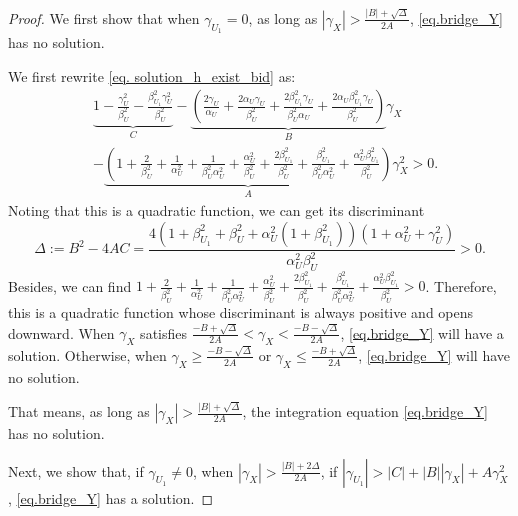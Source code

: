 \documentclass[
  12pt]{article}
\begin{document}
\begin{proof}
We first show that when $\gamma_{U_1} = 0$, as long as $|\gamma_X| > \frac{|B|+\sqrt{\Delta}}{2A}$, \eqref{eq.bridge_Y} has no solution. 

 
We first rewrite \eqref{eq. solution_h_exist_bid} as:
$$
\begin{aligned}
	&\underset{C}{\underbrace{1-\frac{\gamma_{U}^{2}}{\beta_U^2}-\frac{\beta_{U_1}^{2}\gamma_{U}^{2}}{\beta_U^2}}}-\underset{B}{\underbrace{\left( \frac{2\gamma_U}{\alpha_U}+\frac{2\alpha_U\gamma_U}{\beta_{U}^{2}}+\frac{2\beta_{U_1}^{2}\gamma_U}{\beta_{U}^{2}\alpha_U}+\frac{2\alpha_U\beta_{U_1}^{2}\gamma_U}{\beta_{U}^{2}} \right) }}\gamma_X\\
	&-\underset{A}{\underbrace{\left( 1+\frac{2}{\beta_{U}^{2}}+
    \frac{1}{\alpha_{U}^{2}}+\frac{1}{\beta_{U}^{2}\alpha_{U}^{2}}+\frac{\alpha_{U}^{2}}{\beta_{U}^{2}}+\frac{2\beta_{U_1}^{2}}{\beta_{U}^{2}}+\frac{\beta_{U_1}^{2}}{\beta_{U}^{2}\alpha_{U}^{2}}+\frac{\alpha_{U}^{2}\beta_{U_1}^{2}}{\beta_{U}^{2}} \right) }}\gamma_{X}^{2}>0.
\end{aligned}
$$
Noting that this is a quadratic function, we can get its discriminant 
$$
\Delta :=B^2-4AC=\frac{4\left( 1+\beta_{U_1}^{2}+\beta_{U}^{2}+\alpha_{U}^{2}\left( 1+\beta_{U_1}^{2} \right) \right) \left( 1+\alpha_{U}^{2}+\gamma_{U}^{2} \right)}{\alpha_{U}^{2}\beta_{U}^{2}}>0.
$$
Besides, we can find $ 1+\frac{2}{\beta_{U}^{2}}+\frac{1}{\alpha_{U}^{2}}+\frac{1}{\beta_{U}^{2}\alpha_{U}^{2}}+\frac{\alpha_{U}^{2}}{\beta_{U}^{2}}+\frac{2\beta_{U_1}^{2}}{\beta_{U}^{2}}+\frac{\beta_{U_1}^{2}}{\beta_{U}^{2}\alpha_{U}^{2}}+\frac{\alpha_{U}^{2}\beta_{U_1}^{2}}{\beta_{U}^{2}}>0$. Therefore, this is a quadratic function whose discriminant is always positive and opens downward. When $\gamma_X$ satisfies $\frac{-B+\sqrt{\Delta}}{2A}<\gamma_X<\frac{-B-\sqrt{\Delta}}{2A}$, \eqref{eq.bridge_Y} will have a solution. Otherwise, when $\gamma_X\geq\frac{-B-\sqrt{\Delta}}{2A}$ or $\gamma_X\leq\frac{-B+\sqrt{\Delta}}{2A}$, \eqref{eq.bridge_Y} will have no solution. 
 
That means, as long as $|\gamma_X|>\frac{|B|+\sqrt{\Delta}}{2A}$, the integration equation \eqref{eq.bridge_Y} has no solution.

Next, we show that, if $\gamma_{U_1}\ne 0$, when $|\gamma_X| > \frac{|B|+2\Delta}{2A}$, if $|\gamma_{U_1}| > |C| + |B||\gamma_X| + A\gamma_X^2$, \eqref{eq.bridge_Y} has a solution. 


\end{proof}
\end{document}
